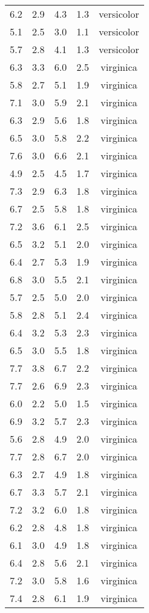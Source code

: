 \documentclass[
  letterpaper,
  DIV=11,
  numbers=noendperiod]{scrartcl}
\begin{document}
\begin{longtable}[]{@{}lrlrc@{}}
6.2 & 2.9 & 4.3 & 1.3 & versicolor \\
5.1 & 2.5 & 3.0 & 1.1 & versicolor \\
5.7 & 2.8 & 4.1 & 1.3 & versicolor \\
6.3 & 3.3 & 6.0 & 2.5 & virginica \\
5.8 & 2.7 & 5.1 & 1.9 & virginica \\
7.1 & 3.0 & 5.9 & 2.1 & virginica \\
6.3 & 2.9 & 5.6 & 1.8 & virginica \\
6.5 & 3.0 & 5.8 & 2.2 & virginica \\
7.6 & 3.0 & 6.6 & 2.1 & virginica \\
4.9 & 2.5 & 4.5 & 1.7 & virginica \\
7.3 & 2.9 & 6.3 & 1.8 & virginica \\
6.7 & 2.5 & 5.8 & 1.8 & virginica \\
7.2 & 3.6 & 6.1 & 2.5 & virginica \\
6.5 & 3.2 & 5.1 & 2.0 & virginica \\
6.4 & 2.7 & 5.3 & 1.9 & virginica \\
6.8 & 3.0 & 5.5 & 2.1 & virginica \\
5.7 & 2.5 & 5.0 & 2.0 & virginica \\
5.8 & 2.8 & 5.1 & 2.4 & virginica \\
6.4 & 3.2 & 5.3 & 2.3 & virginica \\
6.5 & 3.0 & 5.5 & 1.8 & virginica \\
7.7 & 3.8 & 6.7 & 2.2 & virginica \\
7.7 & 2.6 & 6.9 & 2.3 & virginica \\
6.0 & 2.2 & 5.0 & 1.5 & virginica \\
6.9 & 3.2 & 5.7 & 2.3 & virginica \\
5.6 & 2.8 & 4.9 & 2.0 & virginica \\
7.7 & 2.8 & 6.7 & 2.0 & virginica \\
6.3 & 2.7 & 4.9 & 1.8 & virginica \\
6.7 & 3.3 & 5.7 & 2.1 & virginica \\
7.2 & 3.2 & 6.0 & 1.8 & virginica \\
6.2 & 2.8 & 4.8 & 1.8 & virginica \\
6.1 & 3.0 & 4.9 & 1.8 & virginica \\
6.4 & 2.8 & 5.6 & 2.1 & virginica \\
7.2 & 3.0 & 5.8 & 1.6 & virginica \\
7.4 & 2.8 & 6.1 & 1.9 & virginica \\

\end{longtable}
\end{document}
